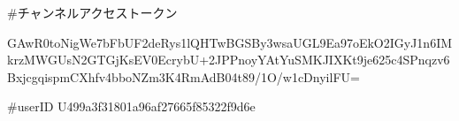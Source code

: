 #チャンネルアクセストークン


GAwR0toNigWe7bFbUF2deRys1lQHTwBGSBy3wsaUGL9Ea97oEkO2IGyJ1n6IMkrzMWGUsN2GTGjKsEV0EcrybU+2JPPnoyYAtYuSMKJIXKt9je625c4SPnqzv6BxjcgqispmCXhfv4bboNZm3K4RmAdB04t89/1O/w1cDnyilFU=

#userID
U499a3f31801a96af27665f85322f9d6e